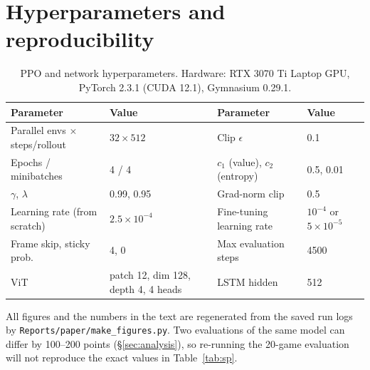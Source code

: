 \documentclass[11pt]{article}
\begin{document}
\appendix
\section{Hyperparameters and reproducibility}
\label{app:hparams}
\begin{table}[h]
\centering\small
\begin{tabular}{ll|ll}
\toprule
Parameter & Value & Parameter & Value\\
\midrule
Parallel envs $\times$ steps/rollout & $32\times512$ & Clip $\epsilon$ & 0.1\\
Epochs / minibatches & 4 / 4 & $c_1$ (value), $c_2$ (entropy) & 0.5, 0.01\\
$\gamma$, $\lambda$ & 0.99, 0.95 & Grad-norm clip & 0.5\\
Learning rate (from scratch) & $2.5\!\times\!10^{-4}$ & Fine-tuning learning rate & $10^{-4}$ or $5\!\times\!10^{-5}$\\
Frame skip, sticky prob. & 4, 0 & Max evaluation steps & 4500\\
ViT & patch 12, dim 128, depth 4, 4 heads & LSTM hidden & 512\\
\bottomrule
\end{tabular}
\caption{PPO and network hyperparameters. Hardware: RTX 3070 Ti Laptop GPU, PyTorch 2.3.1 (CUDA 12.1), Gymnasium 0.29.1.}
\end{table}
All figures and the numbers in the text are regenerated from the saved run logs by \texttt{Reports/paper/make\_figures.py}. Two evaluations of the same model can differ by 100--200 points (\S\ref{sec:analysis}), so re-running the 20-game evaluation will not reproduce the exact values in Table~\ref{tab:sp}.
\end{document}
